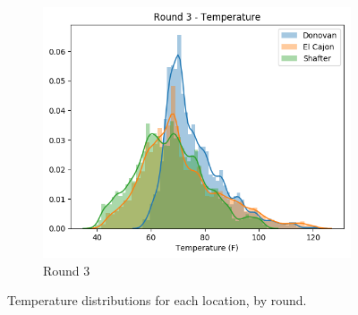 \documentclass[journal abbreviation, manuscript]{copernicus}
\begin{document}
\begin{figure}[H]
\begin{subfigure}{0.32\textwidth}
\includegraphics[width=\textwidth]{results/distributions/round3_temperature.png}
\caption{Round 3}
\end{subfigure}
\caption{Temperature distributions for each location, by round.}
\label{fig:temperature-rounds}
\end{figure}
\end{document}
